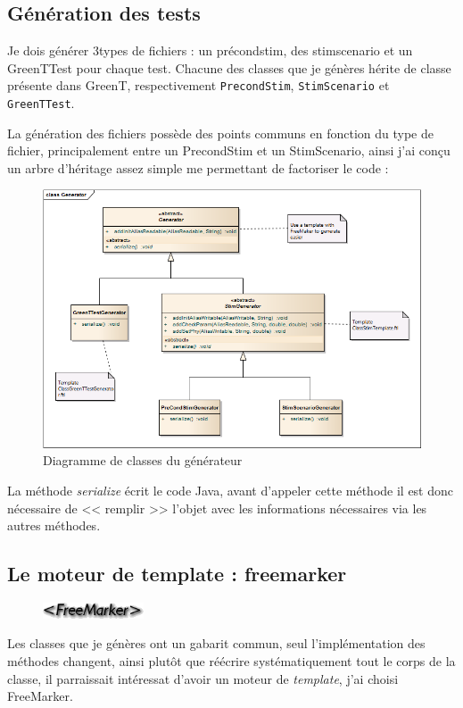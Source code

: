 		\subsection{Génération des tests}
		Je dois générer 3types de fichiers : un précondstim, des stimscenario et un GreenTTest pour chaque test. Chacune des classes que je génères hérite de classe présente dans GreenT, respectivement \texttt{PrecondStim}, \texttt{StimScenario} et \texttt{GreenTTest}.

		La génération des fichiers possède des points communs en fonction du type de fichier, principalement entre un PrecondStim et un StimScenario, ainsi j'ai conçu un arbre d'héritage assez simple me permettant de factoriser le code : 
		\begin{figure}[H]
		\centering
		\includegraphics[width=14cm]{contents/images/generatorClass.png}
		\caption{Diagramme de classes du générateur}
		\end{figure}
		La méthode \textit{serialize} écrit le code Java, avant d'appeler cette méthode il est donc nécessaire de << remplir >> l'objet avec les informations nécessaires via les autres méthodes.
		
		\subsection{Le moteur de template : freemarker}
		\begin{figure}
			\includegraphics[width=3cm]{contents/images/FreeMarker.png}
		\end{figure}
		Les classes que je génères ont un gabarit commun, seul l'implémentation des méthodes changent, ainsi plutôt que réécrire systématiquement tout le corps de la classe, il parraissait intéressat d'avoir un moteur de \textit{template}, j'ai choisi FreeMarker.

